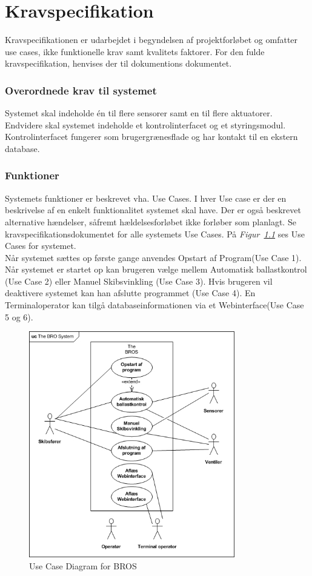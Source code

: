 \chapter{Kravspecifikation}
Kravspecifikationen er udarbejdet i begyndelsen af projektforløbet og omfatter use cases, ikke funktionelle krav samt kvalitets faktorer. For den fulde kravspecifikation, henvises der til dokumentions dokumentet.

\subsection{Overordnede krav til systemet}
Systemet skal indeholde én til flere sensorer samt en til flere aktuatorer. Endvidere skal systemet indeholde et kontrolinterfacet og et styringsmodul. Kontrolinterfacet fungerer som brugergrænesflade og har kontakt til en ekstern database.

\subsection{Funktioner}
Systemets funktioner er beskrevet vha. Use Cases. I hver Use case er der en beskrivelse af en enkelt funktionalitet systemet skal have. Der er også beskrevet alternative hændelser, såfremt hældelsesforløbet ikke forløber som planlagt. Se kravspecifikationsdokumentet for alle systemets Use Cases. På \textit{Figur~\ref{fig:UCDBROS}} ses Use Cases for systemet.\\
Når systemet sættes op første gange anvendes Opstart af Program(Use Case 1). Når systemet er startet op kan brugeren vælge mellem Automatisk ballastkontrol (Use Case 2) eller Manuel Skibsvinkling (Use Case 3). Hvis brugeren vil deaktivere systemet kan han afslutte programmet (Use Case 4). En Terminaloperator kan tilgå databaseinformationen via et Webinterface(Use Case 5 og 6).
\begin{figure}[hbtp]
\centering
\includegraphics[width=0.8\textwidth]{billeder/UCDBROS}
\caption{Use Case Diagram for BROS}
\label{fig:UCDBROS}
\end{figure}
